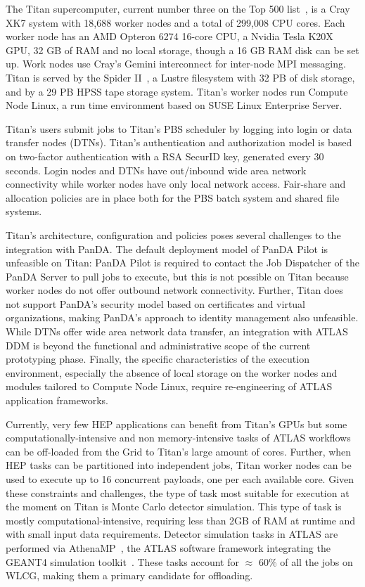 The Titan supercomputer, current number three on the Top 500 list~\cite{top500},
is a Cray XK7 system with 18,688 worker nodes and a total of 299,008 CPU cores.
Each worker node has an AMD Opteron  6274 16-core CPU, a Nvidia Tesla K20X GPU,
32 GB of RAM and no local storage, though a 16 GB RAM disk can be set up. Work
nodes use Cray’s Gemini interconnect for inter-node MPI messaging. Titan is
served by the Spider II~\cite{oral2013olcf}, a Lustre filesystem with 32 PB of
disk storage, and by a 29 PB HPSS tape storage system. Titan’s worker nodes run
Compute Node Linux, a run time environment based on SUSE Linux Enterprise
Server.

Titan's users submit jobs to Titan's PBS scheduler by logging into login or data
transfer nodes (DTNs). Titan's authentication and authorization model is based
on two-factor authentication with a RSA SecurID key, generated every 30 seconds.
Login nodes and DTNs have out/inbound wide area network connectivity while
worker nodes have only local network access. Fair-share and allocation policies
are in place both for the PBS batch system and shared file systems.

Titan's architecture, configuration and policies poses several challenges to the
integration with PanDA. The default deployment
model of PanDA Pilot is unfeasible on Titan: PanDA Pilot is required to contact
the Job Dispatcher of the PanDA Server to pull jobs to execute, but this is not
possible on Titan because worker nodes do not offer outbound network
connectivity. Further, Titan does not support PanDA's security model based on
certificates and virtual organizations, making PanDA's approach to identity
management also unfeasible. While DTNs offer wide area network data transfer, an
integration with ATLAS DDM is beyond the functional and administrative scope of
the current prototyping phase. Finally, the specific characteristics of the
execution environment, especially the absence of local storage on the worker
nodes and modules tailored to Compute Node Linux, require re-engineering of
ATLAS application frameworks.

Currently, very few HEP applications can benefit from Titan's GPUs but some
computationally-intensive and non memory-intensive tasks of ATLAS workflows can
be off-loaded from the Grid to Titan's large amount of cores. Further, when HEP
tasks can be partitioned into independent jobs, Titan worker nodes can be used
to execute up to 16 concurrent payloads, one per each available core. Given
these constraints and challenges, the type of task most suitable for execution
at the moment on Titan is Monte Carlo detector simulation. This type of task is
mostly computational-intensive, requiring less than 2GB of RAM at runtime and
with small input data requirements. Detector simulation tasks in ATLAS are
performed via AthenaMP~\cite{aad2010atlas}, the ATLAS software framework
integrating the GEANT4 simulation toolkit~\cite{agostinelli2003geant4}. These
tasks account for $\approx$ 60\% of all the jobs on WLCG, making them a primary
candidate for offloading.

